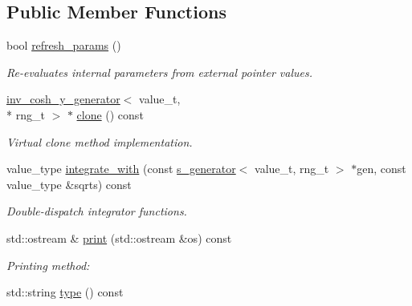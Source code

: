 \subsection*{Public Member Functions}
\begin{DoxyCompactItemize}
\item 
bool \hyperlink{a00316_a74f7c3ad45ce431a29fe8922fdf70283}{refresh\-\_\-params} ()
\begin{DoxyCompactList}\small\item\em Re-\/evaluates internal parameters from external pointer values. \end{DoxyCompactList}\item 
\hypertarget{a00316_a5cca10c0096b002f3a2df430b537dbf6}{\hyperlink{a00316}{inv\-\_\-cosh\-\_\-y\-\_\-generator}$<$ value\-\_\-t, \\*
rng\-\_\-t $>$ $\ast$ \hyperlink{a00316_a5cca10c0096b002f3a2df430b537dbf6}{clone} () const }\label{a00316_a5cca10c0096b002f3a2df430b537dbf6}

\begin{DoxyCompactList}\small\item\em Virtual clone method implementation. \end{DoxyCompactList}\item 
\hypertarget{a00316_a7f36857afe3a2bd445bd95e2342436a6}{value\-\_\-type \hyperlink{a00316_a7f36857afe3a2bd445bd95e2342436a6}{integrate\-\_\-with} (const \hyperlink{a00482}{s\-\_\-generator}$<$ value\-\_\-t, rng\-\_\-t $>$ $\ast$gen, const value\-\_\-type \&sqrts) const }\label{a00316_a7f36857afe3a2bd445bd95e2342436a6}

\begin{DoxyCompactList}\small\item\em Double-\/dispatch integrator functions. \end{DoxyCompactList}\item 
\hypertarget{a00316_a3dcc3e68c6d47c16ca62c0901100ad99}{std\-::ostream \& \hyperlink{a00316_a3dcc3e68c6d47c16ca62c0901100ad99}{print} (std\-::ostream \&os) const }\label{a00316_a3dcc3e68c6d47c16ca62c0901100ad99}

\begin{DoxyCompactList}\small\item\em Printing method\-: \end{DoxyCompactList}\item 
\hypertarget{a00316_a81d7650c266c00be856f5b833b4a46f3}{std\-::string \hyperlink{a00316_a81d7650c266c00be856f5b833b4a46f3}{type} () const }\label{a00316_a81d7650c266c00be856f5b833b4a46f3}


\end{DoxyCompactItemize}
